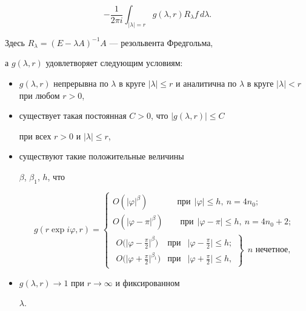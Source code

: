 $$


-\frac 1{2\pi i}\int_{|\lambda|=r}g(\lambda,r)R_\lambda f\,


d\lambda.


$$


Здесь $R_\lambda=(E-\lambda A)^{-1}A$ --- резольвента Фредгольма,


а $g(\lambda,r)$ удовлетворяет следующим условиям:





\begin{itemize}


\item[е)] $g(\lambda,r)$ непрерывна по $\lambda$ в круге $|\lambda|


\le r$ и аналитична по $\lambda$ в круге $|\lambda|<r$ при любом $r>0$,


\item[ж)] существует такая постоянная $C>0$, что $|g(\lambda,r)|\le C$


при всех $r>0$ и $|\lambda|\le r$,


\item[з)] существуют такие положительные величины


$\beta$, $\beta_1$, $h$, что


$$


g(r\exp i\varphi,r)=


\begin{cases}


O(|\varphi|^\beta) \qquad\quad \ \ \text{при}\ \ |\varphi|\le h,\ n=4n_0;\\


O(|\varphi-\pi|^\beta) \qquad \text{при}\ \ |\varphi-\pi|\le h,\ n=4n_0+2;\\


\left.\begin{array}{lll}


O\big(\big|\varphi-\frac {\pi}2\big|^\beta\big) & \text{при} &


\big|\varphi-\frac{\pi}2\big|\le h;\\


O\big(\big|\varphi+\frac {\pi}2\big|^{\beta_1}\big) &


\text{при} & \big|\varphi+\frac {\pi}2\big|\le h,


\end{array}\right\}\ \  \text{$n$ нечетное},


\end{cases}


$$


\item[и)] $g(\lambda,r)\to1$ при $r\to\infty$ и фиксированном


$\lambda$.


\end{itemize}





